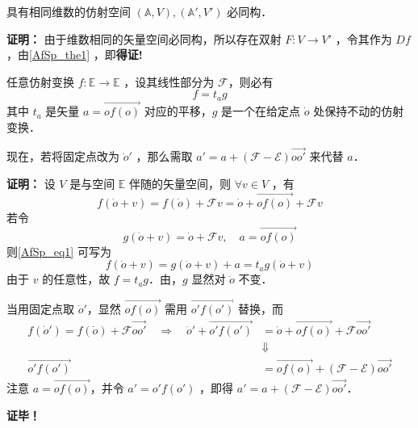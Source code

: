 \begin{corollary}{}
具有相同维数的仿射空间 $(\mathbb A,V),(\mathbb A',V')$ 必同构．
\end{corollary}
\textbf{证明：} 由于维数相同的矢量空间必同构，所以存在双射 $F:V\rightarrow V'$ ，令其作为 $Df$ ，由\autoref{AfSp_the1} ，即\textbf{得证!}
\begin{theorem}{}
任意仿射变换 $f:\mathbb E\rightarrow\mathbb E$ ，设其线性部分为 $\mathcal F$，则必有
\begin{equation}
f=t_a g
\end{equation}
其中 $t_a$ 是矢量 $a=\overrightarrow{of(o)}$ 对应的平移，$g$ 是一个在给定点 $\dot o$ 处保持不动的仿射变换．

现在，若将固定点改为 $\dot o'$ ，那么需取 $a'=a+(\mathcal F-\mathcal E)\overrightarrow{oo'}$ 来代替 $a$．
\end{theorem}

\textbf{证明：} 设 $V$ 是与空间 $\mathbb E$ 伴随的矢量空间，则 $\forall v\in V$ ，有
\begin{equation}\label{AfSp_eq1}
f(\dot o+v)=f(\dot o)+\mathcal F v=\dot o+\overrightarrow{of(o)}+\mathcal F v
\end{equation}
若令
\begin{equation}
g(\dot o+v)=\dot o+\mathcal F v,\quad a=\overrightarrow{of(o)}
\end{equation}
则\autoref{AfSp_eq1} 可写为
\begin{equation}
f(\dot o+v)=g(\dot o+v)+a=t_a g(\dot o+v)
\end{equation}
由于 $v$ 的任意性，故 $f=t_ag$．由，$g$ 显然对 $\dot o$ 不变．

当用固定点取 $\dot o'$，显然 $\overrightarrow{of(o)}$ 需用 $\overrightarrow{o'f(o')}$ 替换，而
\begin{equation}
\begin{aligned}
f(\dot o')=f(\dot o)+\mathcal F \overrightarrow{oo'}\quad\Rightarrow \quad \dot o'+\overrightarrow{o'f(o')}&=\dot o+\overrightarrow{of(o)}+\mathcal F \overrightarrow{oo'}\\
&\Downarrow\\
\overrightarrow{o'f(o')}&=\overrightarrow{of(o)}+(\mathcal F-\mathcal E)\overrightarrow{oo'}
\end{aligned}
\end{equation}
注意 $a=\overrightarrow{of(o)}$，并令 $a'=o'f(o')$ ，即得 $a'=a+(\mathcal F-\mathcal E)\overrightarrow{oo'}$．

\textbf{证毕！}
